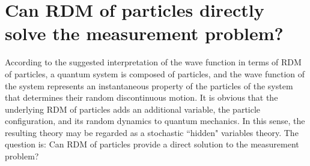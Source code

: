 

\section{Can RDM of particles directly solve the measurement problem?}

According to the suggested interpretation of the wave function in terms of RDM of particles, 
a quantum system is composed of particles, and the wave function of the system represents an instantaneous property of the particles of the system that determines their random discontinuous motion. %
It is obvious that the underlying RDM of particles adds an additional variable, the particle configuration, and its random dynamics to quantum mechanics. %
In this sense, the resulting theory may be regarded as a stochastic ``hidden" variables theory.
The question is: Can RDM of particles provide a direct solution to the measurement problem? 


